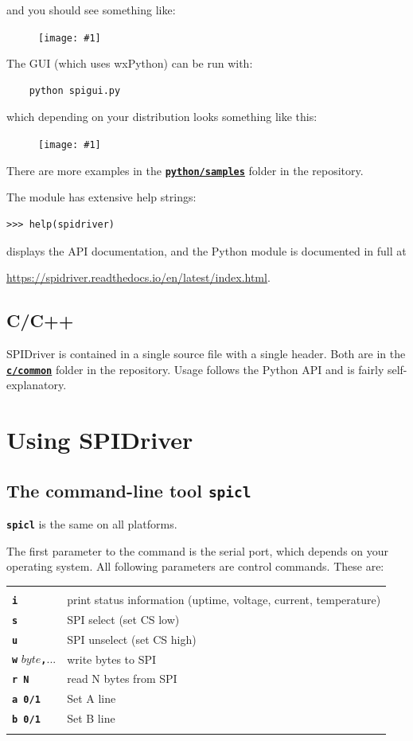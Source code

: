 \documentclass{article}
\newcommand{\png}[1]{
\begin{figure}[H]
\begin{center}
\texttt{[image: \#1]}
\end{center}
\end{figure}
}
\newcommand{\mach}[1]{\texttt{\textbf{#1}}}
\newcommand{\gap}{\vspace{10pt}}
\begin{document}
and you should see something like:

\png{img/spidriver/spidriver-flash}

The GUI (which uses wxPython) can be run with:

\begin{lstlisting}
    python spigui.py
\end{lstlisting}

which depending on your distribution looks something like this:

\png{img/spidriver/spidriver-gui-linux}

There are more examples in the 
\href{https://github.com/jamesbowman/spidriver/tree/master/python/samples}{\mach{python/samples}} folder in the repository.

The module has extensive help strings:
\begin{lstlisting}
>>> help(spidriver)
\end{lstlisting}
displays the API documentation, and
the Python module is documented in full at

\url{https://spidriver.readthedocs.io/en/latest/index.html}.

\newpage
\subsection{C/C++}

SPIDriver is contained in a single source file with a single header.
Both are in the
\href{https://github.com/jamesbowman/spidriver/tree/master/c/common}{\mach{c/common}} folder in the repository.
Usage follows the Python API and is fairly self-explanatory.

\newpage
\section{Using SPIDriver}

\subsection{The command-line tool \mach{spicl}}
\index{spicl@\mach{spicl}}

\mach{spicl} is the same on all platforms.

The first parameter to the command is the serial port, which depends on your operating system.
All following parameters are control commands. These are:

\gap\begin{tabular}{ll}
\hline \\
  \mach{i}     & print status information (uptime, voltage, current, temperature) \\
  \mach{s}     & SPI select (set CS low) \\
  \mach{u}     & SPI unselect (set CS high) \\
  \mach{w} $byte$\mach{,}...     & write bytes to SPI \\
  \mach{r N}   & read N bytes from SPI \\
  \mach{a 0/1} & Set A line \\
  \mach{b 0/1} & Set B line \\
\hline \\
\end{tabular}
\gap
\end{document}
